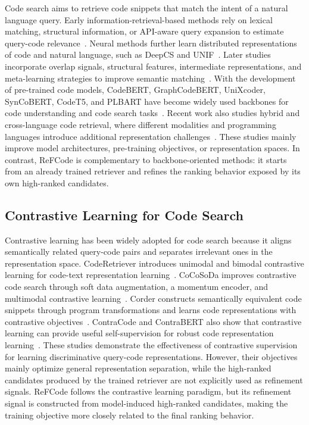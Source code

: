 \documentclass[10pt,conference]{IEEEtran}
\newcommand{\method}{ReFCode}
\begin{document}
Code search aims to retrieve code snippets that match the intent of a natural language query. 
Early information-retrieval-based methods rely on lexical matching, structural information, or API-aware query expansion to estimate query-code relevance~\cite{Sourcerer,Portfolio,CodeHow}. 
Neural methods further learn distributed representations of code and natural language, such as DeepCS and UNIF~\cite{DeepCS,UNIF}. 
Later studies incorporate overlap signals, structural features, intermediate representations, and meta-learning strategies to improve semantic matching~\cite{OCoR,TabCS,CSRS,TranCS,CDCS}. 
With the development of pre-trained code models, CodeBERT, GraphCodeBERT, UniXcoder, SynCoBERT, CodeT5, and PLBART have become widely used backbones for code understanding and code search tasks~\cite{CodeBERT,GraphCodeBERT,UniXcoder,SynCoBERT,CodeT5,PLBART}.
Recent work also studies hybrid and cross-language code retrieval, where different modalities and programming languages introduce additional representation challenges~\cite{UniCoR}. 
These studies mainly improve model architectures, pre-training objectives, or representation spaces. 
In contrast, \method{} is complementary to backbone-oriented methods: it starts from an already trained retriever and refines the ranking behavior exposed by its own high-ranked candidates.

\subsection{Contrastive Learning for Code Search}

Contrastive learning has been widely adopted for code search because it aligns semantically related query-code pairs and separates irrelevant ones in the representation space. 
CodeRetriever introduces unimodal and bimodal contrastive learning for code-text representation learning~\cite{CodeRetriever}. 
CoCoSoDa improves contrastive code search through soft data augmentation, a momentum encoder, and multimodal contrastive learning~\cite{CoCoSoDa}. 
Corder constructs semantically equivalent code snippets through program transformations and learns code representations with contrastive objectives~\cite{Corder}. 
ContraCode and ContraBERT also show that contrastive learning can provide useful self-supervision for robust code representation learning~\cite{ContraCode,ContraBERT}. 
These studies demonstrate the effectiveness of contrastive supervision for learning discriminative query-code representations. 
However, their objectives mainly optimize general representation separation, while the high-ranked candidates produced by the trained retriever are not explicitly used as refinement signals. 
\method{} follows the contrastive learning paradigm, but its refinement signal is constructed from model-induced high-ranked candidates, making the training objective more closely related to the final ranking behavior.
\end{document}
